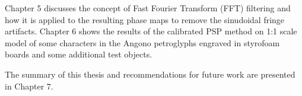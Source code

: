 Chapter 5 discusses the concept of Fast Fourier Transform (FFT) filtering and how it is applied to the resulting phase maps to remove the sinudoidal fringe artifacts.
Chapter 6 shows the results of the calibrated PSP method on 1:1 scale model of some characters in the Angono petroglyphs engraved in styrofoam boards and some additional test objects. 

The summary of this thesis and recommendations for future work are presented in Chapter 7.


